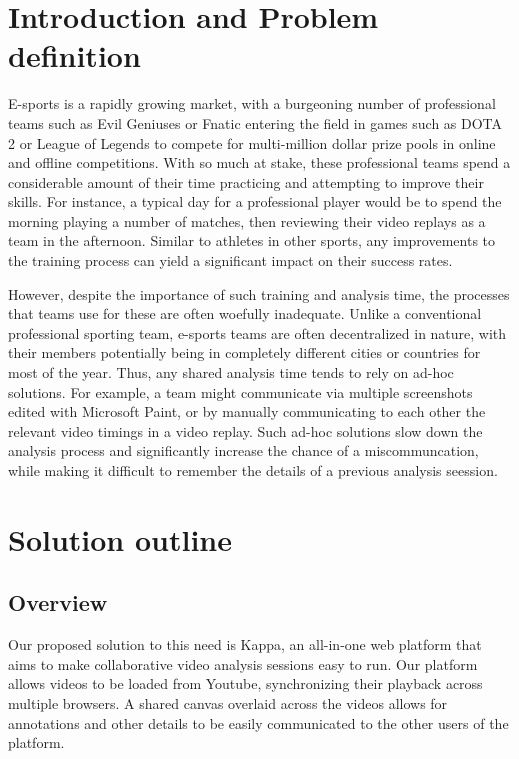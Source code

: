 \documentclass[conference]{IEEEtran}
\begin{document}
\section{Introduction and Problem definition}

  E-sports is a rapidly growing market, with a burgeoning number of professional teams such as Evil Geniuses or Fnatic entering the field in games such as DOTA 2 or League of Legends to compete for multi-million dollar prize pools in online and offline competitions. With so much at stake, these professional teams spend a considerable amount of their time practicing and attempting to improve their skills. For instance, a typical day for a professional player would be to spend the morning playing a number of matches, then reviewing their video replays as a team in the afternoon. Similar to athletes in other sports, any improvements to the training process can yield a significant impact on their success rates.

  However, despite the importance of such training and analysis time, the processes that teams use for these are often woefully inadequate. Unlike a conventional professional sporting team, e-sports teams are often decentralized in nature, with their members potentially being in completely different cities or countries for most of the year. Thus, any shared analysis time tends to rely on ad-hoc solutions. For example, a team might communicate via multiple screenshots edited with Microsoft Paint, or by manually communicating to each other the relevant video timings in a video replay. Such ad-hoc solutions slow down the analysis process and significantly increase the chance of a miscommuncation, while making it difficult to remember the details of a previous analysis seession. 
  
\section{Solution outline}

\subsection{Overview}

  Our proposed solution to this need is Kappa, an all-in-one web platform that aims to make collaborative video analysis sessions easy to run. Our platform allows videos to be loaded from Youtube, synchronizing their playback across multiple browsers. A shared canvas overlaid across the videos allows for annotations and other details to be easily communicated to the other users of the platform.
\end{document}
